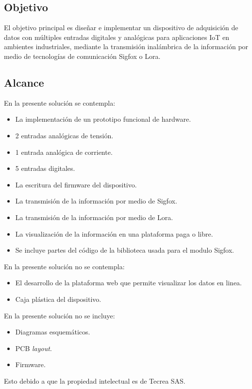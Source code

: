\subsection{Objetivo}
El objetivo principal es diseñar e implementar un dispositivo de adquisición de datos con múltiples entradas digitales y analógicas para aplicaciones IoT en ambientes industriales, mediante la transmisión inalámbrica de la información por medio de tecnologías de comunicación Sigfox o Lora. 

\subsection{Alcance}

En la presente solución se contempla:


\begin{itemize}
	\item La implementación de un prototipo funcional de hardware.
	\item 2 entradas analógicas de tensión.
	\item 1 entrada analógica de corriente.
	\item 5 entradas digitales.
	\item La escritura del firmware del dispositivo.
	\item La transmisión de la información por medio de Sigfox.
	\item La transmisión de la información por medio de Lora.
	\item La visualización de la información en una plataforma paga o libre.
	\item Se incluye partes del código de la biblioteca usada para el modulo Sigfox.
\end{itemize}
En la presente solución no se contempla:
\begin{itemize}
	\item El desarrollo de la plataforma web que permite visualizar los datos en linea.
	\item Caja plástica del dispositivo.
\end{itemize}
En la presente solución no se incluye:
\begin{itemize}
	\item Diagramas esquemáticos.
	\item PCB \textit{layout}.
	\item Firmware.
\end{itemize}

Esto debido a que la propiedad intelectual es de Tecrea SAS.



